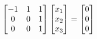 \documentclass[preview]{standalone}
\begin{document}
\begin{align*}
\special{dvisvgm:raw <g id='unique000'>}\begin{bmatrix} -1 & 1 & 1 \\ 0 & 0 & 1 \\ 0 & 0 & 1 \end{bmatrix} \begin{bmatrix} x_1 \\ x_2 \\ x_3 \end{bmatrix} = \begin{bmatrix} 0 \\ 0 \\ 0 \end{bmatrix}\special{dvisvgm:raw </g>}
\end{align*}
\end{document}
